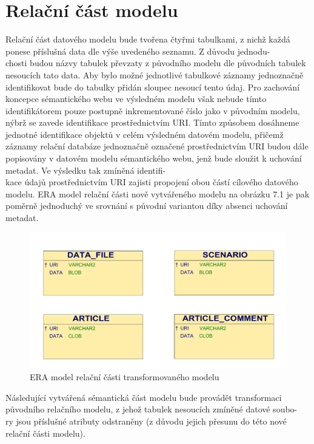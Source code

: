 \documentclass{projekt}
\begin{document}
\section{Relační část modelu}
\hspace{0.65cm}Relační část datového modelu bude tvořena čtyřmi tabulkami, z nichž každá ponese příslušná data dle výše uvedeného seznamu. Z důvodu jednodu-\\chosti budou názvy tabulek převzaty z původního modelu dle původních tabulek nesoucích tato data. Aby bylo možné jednotlivé tabulkové záznamy jednoznačně identifikovat bude do tabulky přidán sloupec nesoucí tento údaj. Pro zachování  koncepce sémantického webu ve výsledném modelu však nebude tímto identifikátorem pouze postupně inkrementované číslo jako v původním modelu, nýbrž se zavede identifikace prostřednictvím URI. Tímto způsobem dosáhneme jednotné identifikace objektů v celém výsledném datovém modelu, přičemž záznamy relační databáze jednoznačně označené prostřednictvím URI budou dále popisovány v datovém modelu sémantického webu, jenž bude sloužit k uchování metadat. Ve výsledku tak zmíněná identifi-\\kace údajů prostřednictvím URI zajisti propojení obou částí cílového datového modelu. ERA model relační části nově vytvářeného modelu na obrázku 7.1 je pak poměrně jednoduchý ve srovnání s původní variantou díky absenci uchování metadat. 

\begin{figure}[htb]
\begin{center}
\includegraphics[scale=0.35]{eraNovej.pdf}
\caption{ERA model relační části transformovaného modelu}
\end{center}
\end{figure}


Následující vytvářená sémantická část modelu bude provádět transformaci původního relačního modelu, z jehož tabulek nesoucích zmíněné datové soubo-\\ry jsou příslušné atributy odstraněny (z důvodu jejich přesunu do této nové relační části modelu).
\end{document}
